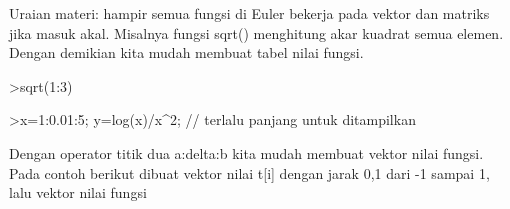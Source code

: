 \documentclass[a4paper,10pt]{article}
\begin{document}
\begin{eulernotebook}
\begin{eulercomment}
\begin{eulercomment}
\begin{eulercomment}
\begin{eulercomment}
\begin{eulercomment}
\begin{eulercomment}
\begin{eulercomment}
\begin{eulercomment}
\begin{eulercomment}
\begin{eulercomment}
\begin{eulercomment}
\begin{eulercomment}
\begin{eulercomment}
\begin{eulercomment}
\begin{eulercomment}
\begin{eulercomment}
\begin{eulercomment}
Uraian materi: hampir semua fungsi di Euler bekerja pada vektor dan matriks
jika masuk akal. Misalnya fungsi sqrt() menghitung akar kuadrat semua
elemen. Dengan demikian kita mudah membuat tabel nilai fungsi.
\end{eulercomment}
\begin{eulerprompt}
>sqrt(1:3)
\end{eulerprompt}
\begin{euleroutput}
  [1,  1.41421,  1.73205]
\end{euleroutput}
\begin{eulerprompt}
>x=1:0.01:5; y=log(x)/x^2; // terlalu panjang untuk ditampilkan
\end{eulerprompt}
\begin{eulercomment}
Dengan operator titik dua a:delta:b kita mudah membuat vektor nilai fungsi.
Pada contoh berikut dibuat vektor nilai t[i] dengan jarak 0,1 dari -1 sampai
1, lalu vektor nilai fungsi


\end{eulercomment}
\end{eulercomment}
\end{eulercomment}
\end{eulercomment}
\end{eulercomment}
\end{eulercomment}
\end{eulercomment}
\end{eulercomment}
\end{eulercomment}
\end{eulercomment}
\end{eulercomment}
\end{eulercomment}
\end{eulercomment}
\end{eulercomment}
\end{eulercomment}
\end{eulercomment}
\end{eulercomment}
\end{eulernotebook}
\end{document}
